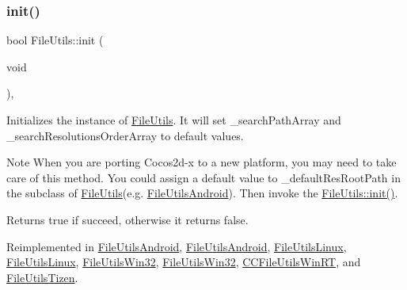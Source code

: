\mbox{\label{classFileUtils_a2c891e99dc7af7343f4f9e8d4798a563}} 
\subsubsection{\texorpdfstring{init()}{init()}\hspace{0.1cm}{\footnotesize\ttfamily [1/2]}}
{\footnotesize\ttfamily bool File\+Utils\+::init (\begin{DoxyParamCaption}\item[{void}]{ }\end{DoxyParamCaption})\hspace{0.3cm}{\ttfamily [protected]}, {\ttfamily [virtual]}}

Initializes the instance of \hyperlink{classFileUtils}{File\+Utils}. It will set \+\_\+search\+Path\+Array and \+\_\+search\+Resolutions\+Order\+Array to default values.

\begin{DoxyNote}{Note}
When you are porting Cocos2d-\/x to a new platform, you may need to take care of this method. You could assign a default value to \+\_\+default\+Res\+Root\+Path in the subclass of \hyperlink{classFileUtils}{File\+Utils}(e.\+g. \hyperlink{classFileUtilsAndroid}{File\+Utils\+Android}). Then invoke the \hyperlink{classFileUtils_a2c891e99dc7af7343f4f9e8d4798a563}{File\+Utils\+::init()}. 
\end{DoxyNote}
\begin{DoxyReturn}{Returns}
true if succeed, otherwise it returns false. 
\end{DoxyReturn}


Reimplemented in \hyperlink{classFileUtilsAndroid_a5ff9d802609690baa039ebef0508b2c6}{File\+Utils\+Android}, \hyperlink{classFileUtilsAndroid_a5ff9d802609690baa039ebef0508b2c6}{File\+Utils\+Android}, \hyperlink{classFileUtilsLinux_a6de155528c1b10597d623f784b72762c}{File\+Utils\+Linux}, \hyperlink{classFileUtilsLinux_a1f11f2fb2b248fe6670cf991251d2821}{File\+Utils\+Linux}, \hyperlink{classFileUtilsWin32_a686cc28ad94c2c904c857cb2808b36d4}{File\+Utils\+Win32}, \hyperlink{classFileUtilsWin32_a686cc28ad94c2c904c857cb2808b36d4}{File\+Utils\+Win32}, \hyperlink{classCCFileUtilsWinRT_a1f2d5c30d599ab4490a2dead634f7459}{C\+C\+File\+Utils\+Win\+RT}, and \hyperlink{classFileUtilsTizen_a3c094c5c41c9f01e31158e1c81690419}{File\+Utils\+Tizen}.

\mbox{\label{classFileUtils_aff29da112f10057767427bdb6eb747c3}} 
